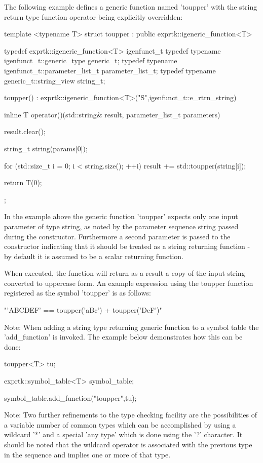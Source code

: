 The following example defines a generic function  named 'toupper' with
the string return type function operator being explicitly overridden:

template <typename T>
struct toupper : public exprtk::igeneric\_function<T>
{
typedef exprtk::igeneric\_function<T> igenfunct\_t
typedef typename igenfunct\_t::generic\_type generic\_t;
typedef typename igenfunct\_t::parameter\_list\_t parameter\_list\_t;
typedef typename generic\_t::string\_view string\_t;

toupper()
: exprtk::igeneric\_function<T>("S",igenfunct\_t::e\_rtrn\_string)
{}

inline T operator()(std::string\& result,
parameter\_list\_t parameters)
{
	result.clear();
	
	string\_t string(params[0]);
	
	for (std::size\_t i = 0; i < string.size(); ++i)
	{
		result += std::toupper(string[i]);
	}
	
	return T(0);
}
};


In the example above the  generic function 'toupper' expects only  one
input parameter  of type  string, as  noted by  the parameter sequence
string passed during the  constructor. Furthermore a second  parameter
is passed to the constructor indicating that it should be treated as a
string returning function -  by default it is  assumed to be a  scalar
returning function.

When executed,  the function  will return  as a  result a  copy of the
input string converted to uppercase form. An example expression  using
the toupper function registered as the symbol 'toupper' is as follows:

"'ABCDEF' == toupper('aBc') + toupper('DeF')"


Note: When adding a string type returning generic function to a symbol
table the  'add\_function' is invoked.  The example  below demonstrates
how this can be done:

toupper<T> tu;

exprtk::symbol\_table<T> symbol\_table;

symbol\_table.add\_function("toupper",tu);


Note: Two further  refinements to the  type checking facility  are the
possibilities  of  a variable  number  of common  types  which can  be
accomplished by using a wildcard '*' and a special 'any type' which is
done using  the '?'  character. It  should be  noted that the wildcard
operator is  associated with  the previous  type in  the sequence  and
implies one or more of that type.

